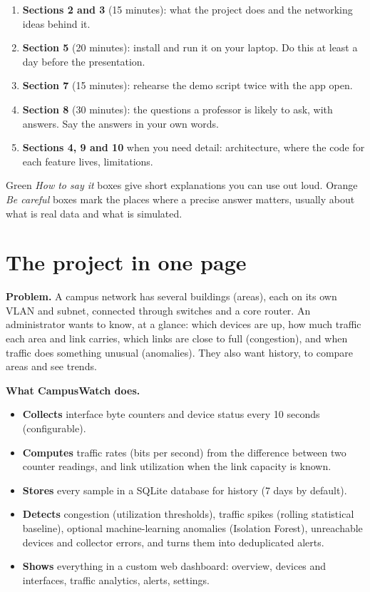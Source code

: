 \documentclass[11pt,a4paper]{article}
\begin{document}
\begin{enumerate}
  \item \textbf{Sections 2 and 3} (15 minutes): what the project does and the networking ideas behind it.
  \item \textbf{Section 5} (20 minutes): install and run it on your laptop. Do this at least a day before the presentation.
  \item \textbf{Section 7} (15 minutes): rehearse the demo script twice with the app open.
  \item \textbf{Section 8} (30 minutes): the questions a professor is likely to ask, with answers. Say the answers in your own words.
  \item \textbf{Sections 4, 9 and 10} when you need detail: architecture, where the code for each feature lives, limitations.
\end{enumerate}

Green \emph{How to say it} boxes give short explanations you can use out loud. Orange \emph{Be careful} boxes mark the places where
a precise answer matters, usually about what is real data and what is simulated.

\section{The project in one page}

\textbf{Problem.} A campus network has several buildings (areas), each on its own VLAN and subnet, connected through switches and
a core router. An administrator wants to know, at a glance: which devices are up, how much traffic each area and link carries,
which links are close to full (congestion), and when traffic does something unusual (anomalies). They also want history,
to compare areas and see trends.

\textbf{What CampusWatch does.}
\begin{itemize}
  \item \textbf{Collects} interface byte counters and device status every 10 seconds (configurable).
  \item \textbf{Computes} traffic rates (bits per second) from the difference between two counter readings, and link utilization
        when the link capacity is known.
  \item \textbf{Stores} every sample in a SQLite database for history (7 days by default).
  \item \textbf{Detects} congestion (utilization thresholds), traffic spikes (rolling statistical baseline), optional machine-learning
        anomalies (Isolation Forest), unreachable devices and collector errors, and turns them into deduplicated alerts.
  \item \textbf{Shows} everything in a custom web dashboard: overview, devices and interfaces, traffic analytics, alerts, settings.
\end{itemize}
\end{document}

